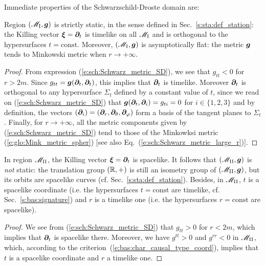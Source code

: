 Immediate properties of the Schwarzschild-Droste domain are:

\begin{prop}
Region $(\mathscr{M}_{\rm I}, \bm{g})$ is strictly static, in the sense defined in
Sec.~\ref{s:sta:def_station}: the Killing vector $\bm{\xi} = \bm{\partial}_t$ is
timelike on all $\mathscr{M}_{\rm I}$ and is orthogonal to the hypersurfaces $t= \mathrm{const}$.
Moreover, $(\mathscr{M}_{\rm I}, \bm{g})$ is asymptotically flat: the metric $\bm{g}$ tends to Minkowski metric
when $r\rightarrow +\infty$.
\end{prop}

\begin{proof}
From expression (\ref{e:sch:Schwarz_metric_SD}), we see that $g_{tt} < 0$ for $r > 2 m$.
Since $g_{tt} = \bm{g}(\bm{\partial}_t, \bm{\partial}_t)$, this implies that $\bm{\partial}_t$ is timelike.
Moreover $\bm{\partial}_t$ is orthogonal to any hypersurface $\Sigma_t$ defined by a constant
value of $t$, since we read on (\ref{e:sch:Schwarz_metric_SD}) that
$\bm{g}(\bm{\partial}_t, \bm{\partial}_i) = g_{ti} = 0$ for $i\in\{1,2,3\}$ and by definition,
the vectors $(\bm{\partial}_i) = (\bm{\partial}_r,\bm{\partial}_\theta,\bm{\partial}_\varphi)$ form a basis of the tangent planes to $\Sigma_t$.
Finally, for $r\to +\infty$, all the metric components given by (\ref{e:sch:Schwarz_metric_SD})
tend to those of the Minkowksi metric (\ref{e:glo:Mink_metric_spher})
[see also Eq.~(\ref{e:sch:Schwarz_metric_large_r})].
\end{proof}

\begin{prop}
\label{p:sch:prop_M_II}
In region $\mathscr{M}_{\rm II}$, the Killing vector $\bm{\xi} = \bm{\partial}_t$ is spacelike.
It follows that $(\mathscr{M}_{\rm II},\bm{g})$ is \emph{not} static:
the translation group $(\mathbb{R},+)$ is still an
isometry group of $(\mathscr{M}_{\rm II},\bm{g})$, but its orbits are spacelike curves
(cf. Sec.~\ref{s:sta:def_station}).
Besides, in $\mathscr{M}_{\rm II}$, $t$ is a spacelike coordinate
(i.e. the hypersurfaces $t=\mathrm{const}$ are timelike, cf. Sec.~\ref{s:bas:signature})
and $r$ is a timelike one (i.e. the hypersurfaces $r=\mathrm{const}$ are spacelike).
\end{prop}

\begin{proof}
We see from (\ref{e:sch:Schwarz_metric_SD}) that $g_{tt} > 0$ for $r< 2m$,
which implies that $\bm{\partial}_t$ is spacelike there.
Moreover, we have $g^{tt} > 0$ and $g^{rr} < 0$ in
$\mathscr{M}_{\rm II}$, which, according to the criterion~(\ref{e:bas:char_causal_type_coord}),
implies that $t$ is a spacelike coordinate
and $r$ a timelike one.
\end{proof}

